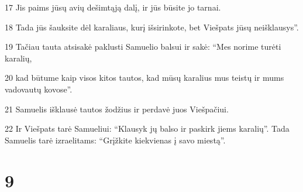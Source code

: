 \par 17 Jis paims jūsų avių dešimtąją dalį, ir jūs būsite jo tarnai. 
\par 18 Tada jūs šauksite dėl karaliaus, kurį išsirinkote, bet Viešpats jūsų neišklausys”. 
\par 19 Tačiau tauta atsisakė paklusti Samuelio balsui ir sakė: “Mes norime turėti karalių, 
\par 20 kad būtume kaip visos kitos tautos, kad mūsų karalius mus teistų ir mums vadovautų kovose”. 
\par 21 Samuelis išklausė tautos žodžius ir perdavė juos Viešpačiui. 
\par 22 Ir Viešpats tarė Samueliui: “Klausyk jų balso ir paskirk jiems karalių”. Tada Samuelis tarė izraelitams: “Grįžkite kiekvienas į savo miestą”.



\chapter{9}

